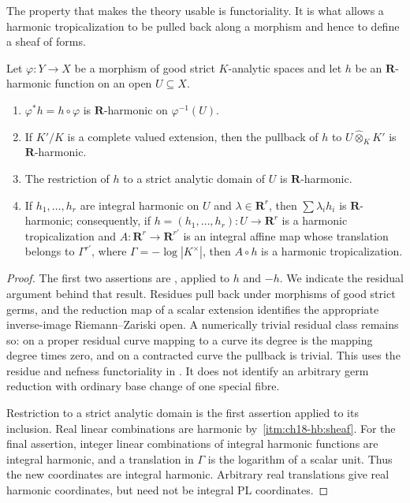 The property that makes the theory usable is functoriality.  It is what
allows a harmonic tropicalization to be pulled back along a morphism and
hence to define a sheaf of forms.

\begin{proposition}
\label{prop:ch18-harmonic-functorial}
Let $\varphi:Y\to X$ be a morphism of good strict $K$-analytic spaces and
let $h$ be an $\mathbf R$-harmonic function on an open $U\subseteq X$.
\begin{enumerate}
\item\label{itm:ch18-hf:pullback}
 $\varphi^*h=h\circ\varphi$ is $\mathbf R$-harmonic on $\varphi^{-1}(U)$.
\item\label{itm:ch18-hf:base}
 If $K'/K$ is a complete valued extension, then the pullback of $h$ to
 $U\widehat\otimes_KK'$ is $\mathbf R$-harmonic.
\item\label{itm:ch18-hf:domain}
 The restriction of $h$ to a strict analytic domain of $U$ is
 $\mathbf R$-harmonic.
\item\label{itm:ch18-hf:compose}
 If $h_1,\ldots,h_r$ are integral harmonic on $U$ and
 $\lambda\in\mathbf R^r$, then $\sum\lambda_ih_i$ is $\mathbf R$-harmonic;
 consequently, if $h=(h_1,\ldots,h_r):U\to\mathbf R^r$ is a harmonic
 tropicalization and $A:\mathbf R^r\to\mathbf R^{r'}$ is an integral affine
 map whose translation belongs to
 $\Gamma^{r'}$, where $\Gamma=-\log|K^\times|$, then $A\circ h$ is a
 harmonic tropicalization.
\end{enumerate}
\end{proposition}

\begin{proof}
The first two assertions are \cite[Proposition~7.6(1),(2)]{GJR26}, applied
to $h$ and $-h$.  We indicate the residual argument behind that result.
Residues pull back under morphisms of good strict germs, and the reduction
map of a scalar extension identifies the appropriate inverse-image
Riemann--Zariski open.  A numerically trivial residual class remains so:
on a proper residual curve mapping to a curve its degree is the mapping
degree times zero, and on a contracted curve the pullback is trivial.
This uses the residue and nefness functoriality in
\cite[Lemma~6.12 and \S\S6.13, 6.19]{GJR26}.  It does not identify an
arbitrary germ reduction with ordinary base change of one special fibre.

Restriction to a strict analytic domain is the first assertion applied to
its inclusion.  Real linear combinations are harmonic by
\,\cref{itm:ch18-hb:sheaf}.  For the final
assertion, integer linear combinations of integral harmonic functions are
integral harmonic, and a translation in $\Gamma$ is the logarithm of a
scalar unit.  Thus the new coordinates are integral harmonic.  Arbitrary
real translations give real harmonic coordinates, but need not be integral
PL coordinates.
\end{proof}

